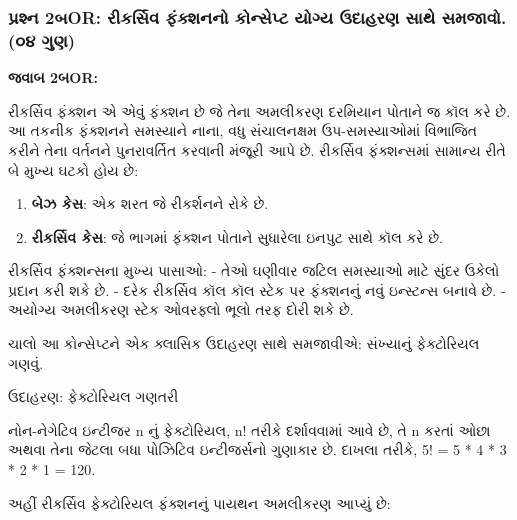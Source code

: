 \hypertarget{uxaaauxab0uxab6uxaa8-2uxaacor-uxab0uxa95uxab0uxab8uxab5-uxaabuxa95uxab6uxaa8uxaa8-uxa95uxaa8uxab8uxaaauxa9f-uxaafuxa97uxaaf-uxa89uxaa6uxab9uxab0uxaa3-uxab8uxaa5-uxab8uxaaeuxa9cuxab5.-uxae6uxaea-uxa97uxaa3}{%
\subsubsection{પ્રશ્ન 2બOR: રીકર્સિવ ફંક્શનનો કોન્સેપ્ટ યોગ્ય ઉદાહરણ સાથે સમજાવો.
(૦૪
ગુણ)}\label{uxaaauxab0uxab6uxaa8-2uxaacor-uxab0uxa95uxab0uxab8uxab5-uxaabuxa95uxab6uxaa8uxaa8-uxa95uxaa8uxab8uxaaauxa9f-uxaafuxa97uxaaf-uxa89uxaa6uxab9uxab0uxaa3-uxab8uxaa5-uxab8uxaaeuxa9cuxab5.-uxae6uxaea-uxa97uxaa3}}

\textbf{જવાબ 2બOR:}

રીકર્સિવ ફંક્શન એ એવું ફંક્શન છે જે તેના અમલીકરણ દરમિયાન પોતાને જ કૉલ કરે છે. આ તકનીક
ફંક્શનને સમસ્યાને નાના, વધુ સંચાલનક્ષમ ઉપ-સમસ્યાઓમાં વિભાજિત કરીને તેના વર્તનને
પુનરાવર્તિત કરવાની મંજૂરી આપે છે. રીકર્સિવ ફંક્શન્સમાં સામાન્ય રીતે બે મુખ્ય ઘટકો હોય છે:

\begin{enumerate}
\def\labelenumi{\arabic{enumi}.}
\tightlist
\item
  \textbf{બેઝ કેસ}: એક શરત જે રીકર્શનને રોકે છે.
\item
  \textbf{રીકર્સિવ કેસ}: જે ભાગમાં ફંક્શન પોતાને સુધારેલા ઇનપુટ સાથે કૉલ કરે છે.
\end{enumerate}

રીકર્સિવ ફંક્શન્સના મુખ્ય પાસાઓ: - તેઓ ઘણીવાર જટિલ સમસ્યાઓ માટે સુંદર ઉકેલો પ્રદાન
કરી શકે છે. - દરેક રીકર્સિવ કૉલ કૉલ સ્ટેક પર ફંક્શનનું નવું ઇન્સ્ટન્સ બનાવે છે. - અયોગ્ય
અમલીકરણ સ્ટેક ઓવરફ્લો ભૂલો તરફ દોરી શકે છે.

ચાલો આ કોન્સેપ્ટને એક ક્લાસિક ઉદાહરણ સાથે સમજાવીએ: સંખ્યાનું ફેક્ટોરિયલ ગણવું.

ઉદાહરણ: ફેક્ટોરિયલ ગણતરી

નોન-નેગેટિવ ઇન્ટીજર n નું ફેક્ટોરિયલ, n! તરીકે દર્શાવવામાં આવે છે, તે n કરતાં ઓછા અથવા
તેના જેટલા બધા પોઝિટિવ ઇન્ટીજર્સનો ગુણાકાર છે. દાખલા તરીકે, 5! = 5 * 4 * 3 * 2
* 1 = 120.

અહીં રીકર્સિવ ફેક્ટોરિયલ ફંક્શનનું પાયથન અમલીકરણ આપ્યું છે:

\begin{Shaded}
\begin{Highlighting}[]
    \OperatorTok{==}  \OperatorTok{==} \NormalTok{:}
         
    
    \NormalTok{:}
        \OperatorTok{*}\OperatorTok{{-}} \NormalTok{)}

\NormalTok{))  }
\end{Highlighting}
\end{Shaded}

